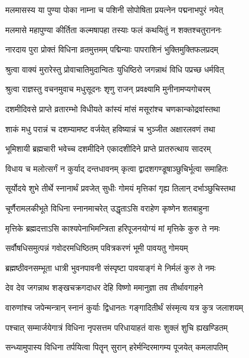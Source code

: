 
\twolineshloka
{मलमासस्य या पुण्या पोका नाम्ना च पशिनी}
{सोपोषिता प्रयत्नेन पद्मनाभपुरं नयेत्} %

\twolineshloka
{मलमासे महापुण्या कीर्तिता कल्मषापहा}
{तस्याः फलं कथयितुं न शक्तश्चतुराननः} %

\twolineshloka
{नारदाय पुरा प्रोक्तं विधिना व्रतमुत्तमम्}
{पद्मिन्याः पापराशिनं भुक्तिमुक्तिफलप्रदम्} %

\twolineshloka
{श्रुत्वा वाक्यं मुरारेस्तु प्रोवाचातिमुदान्वितः}
{युधिष्ठिरो जगन्नाथं विधि पप्रच्छ धर्मवित्} %

\twolineshloka
{श्रुत्वा राज्ञस्तु वचनमुवाच मधुसूदनः}
{शृणु राजन् प्रवक्ष्यामि मुनीनामप्यगोचरम्} %

\twolineshloka
{दशमीदिवसे प्राप्ते व्रतारम्भो विधीयते}
{कांस्यं मांसं मसूरांश्च चणकान्कोद्रवांस्तथा} %

\twolineshloka
{शाकं मधु परान्नं च दशम्यामष्ट वर्जयेत्}
{हविष्यान्नं च भुञ्जीत अक्षारलवणं तथा} %

\twolineshloka
{भूमिशायी ब्रह्मचारी भवेच्च दशमीदिने}
{एकादशीदिने प्राप्ते प्रातरुत्थाय सादरम्} %

\twolineshloka
{विधाय च मलोत्सर्गं न कुर्याद् दन्तधावनम्}
{कृत्वा द्वादशगण्डूषाञ्छुचिर्भूत्वा समाहितः} %

\twolineshloka
{सूर्योदये शुभे तीर्थे स्नानार्थं प्रवजेत् सुधीः}
{गोमयं मृत्तिकां गृह्य तिलान् दर्भाञ्छुचिस्तथा} %

\twolineshloka
{चूर्णैरामलकीभूते विधिना स्नानमाचरेत्}
{उद्धृताऽसि वराहेण कृष्णेन शतबाहुना} %

\twolineshloka
{मृत्तिके ब्रह्मदत्ताऽसि काश्यपेनाभिमन्त्रिता}
{हरिपूजनयोग्यं मां मृत्तिके कुरु ते नमः} %

\twolineshloka
{सर्वौषधिसमुत्पन्नं गवोदरमधिष्ठितम्}
{पवित्रकरणं भूमी पावयतु गोमयम्} %

\twolineshloka
{ब्रह्मष्ठीवनसम्भूता धात्री भुवनपावनी}
{संस्पृष्टा पावयाङ्गं मे निर्मलं कुरु ते नमः} %

\twolineshloka
{देव देव जगन्नाथ शङ्खचक्रगदाधर}
{देहि विष्णो ममानुज्ञा तव तीर्थावगाहने} %

\twolineshloka
{वारुणांश्च जपेन्मन्त्रान् स्नानं कुर्याः द्विधानतः}
{गङ्गादितीर्थं संस्मृत्य यत्र कुत्र जलाशयम्} %

\twolineshloka
{पश्चात् सम्मार्जयेगात्रं विधिना नृपसत्तम}
{परिधायाहतं वासः शुक्लं शुचि ह्यखण्डितम्} %

\twolineshloka
{सन्ध्यामुपास्य विधिना तर्पयित्वा पितॄन् सुरान्}
{हरेर्मन्दिरमागम्य पूजयेत् कमलापतिम्} %

